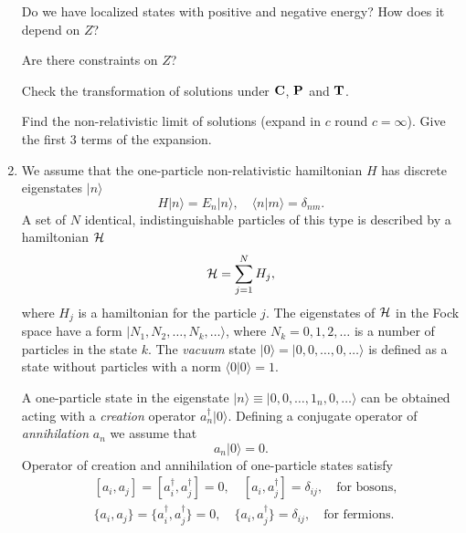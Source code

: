 \documentclass[a4paper,11pt]{article}
\begin{document}
\begin{enumerate}
  Do we have localized states with positive and negative energy? How
  does it depend on $Z$?

  Are there constraints on $Z$?

  Check the transformation of solutions under $\mathbf{C}$, $\mathbf{P}$ and
  $\mathbf{T}$.

  Find the non-relativistic limit of solutions (expand in $c$ round
  $c = \infty$). Give the first 3 terms of the expansion.

\item We assume that the one-particle non-relativistic hamiltonian $H$
  has discrete eigenstates $| n \rangle$
  \begin{equation}
    \label{eq:1}
    H | n \rangle = E_{ n } | n \rangle, \quad
    \langle n | m \rangle = \delta_{ n m }.
  \end{equation}
  A set of $N$ identical, indistinguishable particles of this type is
  described by a hamiltonian $\mathcal{H}$
  \begin{equation}
    \label{eq:2}
    \mathcal{H} = \sum_{ j = 1 }^{ N } H_{ j },
  \end{equation}
  where $H_{ j }$ is a hamiltonian for the particle $j$. The
  eigenstates of $\mathcal{H}$ in the Fock space have a form
  $| N_{ 1 }, N_{ 2 }, \ldots, N_{ k }, \ldots \rangle$, where
  $N_{ k } = 0, 1, 2, \ldots$ is a number of particles in the state
  $k$. The \textit{vacuum} state
  $| 0 \rangle = | 0, 0, \ldots, 0, \ldots \rangle$ is defined as a state without particles
  with a norm $\langle 0 | 0 \rangle = 1$.

  A one-particle state in the eigenstate
  $| n \rangle \equiv | 0, 0, \ldots, 1_{ n }, 0, \ldots \rangle$ can be obtained acting
  with a \textit{creation} operator $a_{ n }^{ \dagger } | 0 \rangle$. Defining a
  conjugate operator of \textit{annihilation} $a_{ n }$ we assume that
  \begin{equation}
    \label{eq:3}
    a_{ n } | 0 \rangle = 0.
  \end{equation}
  Operator of creation and annihilation of one-particle states satisfy
  \begin{align}
    &[ a_{ i }, a_{ j } ] = [ a_{ i }^{ \dagger }, a_{ j }^{ \dagger } ] = 0, \quad
      [ a_{ i }, a_{ j }^{ \dagger } ] = \delta_{ i j }, \quad
      \textrm{for bosons}, \\
    &\{ a_{ i }, a_{ j } \} = \{ a_{ i }^{ \dagger }, a_{ j }^{ \dagger } \} = 0, \quad
      \{ a_{ i }, a_{ j }^{ \dagger } \} = \delta_{ i j }, \quad
      \textrm{for fermions}.
  \end{align}


\end{enumerate}
\end{document}
